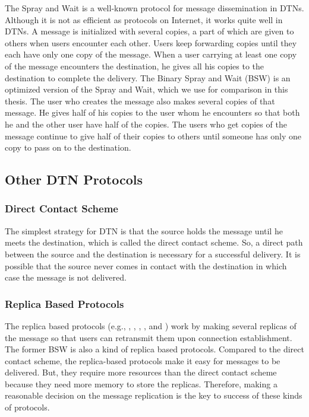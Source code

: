 \noindent The Spray and Wait \cite{C31} is a well-known protocol for message dissemination in DTNs. Although it is not as efficient as protocols on Internet, it works quite well in DTNs. A message is initialized with several copies, a part of which are given to others when users encounter each other. Users keep forwarding copies until they each have only one copy of the message. When a user carrying at least one copy of the message encounters the destination, he gives all his copies to the destination to complete the delivery. The Binary Spray and Wait (BSW) \cite{C31} is an optimized version of the Spray and Wait, which we use for comparison in this thesis. The user who creates the message also makes several copies of that message. He gives half of his copies to the user whom he encounters so that both he and the other user have half of the copies. The users who get copies of the message continue to give half of their copies to others until someone has only one copy to pass on to the destination.

\subsection{ Other DTN Protocols}


\subsubsection{ Direct Contact Scheme}

\noindent The simplest strategy for DTN is that the source holds the message until he meets the destination, which is called the direct contact scheme. So, a direct path between the source and the destination is necessary for a successful delivery. It is possible that the source never comes in contact with the destination in which case the message is not delivered. 


\subsubsection{ Replica Based Protocols}

\noindent The replica based protocols (e.g., \cite{C6}, \cite{C7}, \cite{C8}, \cite{C9}, and \cite{C37}) work by making several replicas of the message so that users can retransmit them upon connection establishment. The former BSW is also a kind of replica based protocols. Compared to the direct contact scheme, the replica-based protocols make it easy for messages to be delivered. But, they require more resources than the direct contact scheme because they need more memory to store the replicas. Therefore, making a reasonable decision on the message replication is the key to success of these kinds of protocols.


